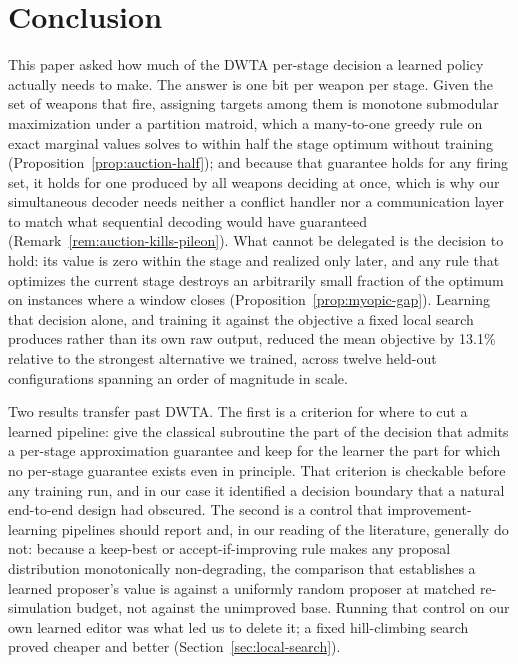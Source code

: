 \section{Conclusion}
\label{sec:conclusion}

This paper asked how much of the DWTA per-stage decision a learned policy
actually needs to make. The answer is one bit per weapon per stage. Given the
set of weapons that fire, assigning targets among them is monotone submodular
maximization under a partition matroid, which a many-to-one greedy rule on
exact marginal values solves to within half the stage optimum without
training (Proposition~\ref{prop:auction-half}); and because that guarantee
holds for any firing set, it holds for one produced by all weapons deciding
at once, which is why our simultaneous decoder needs neither a conflict
handler nor a communication layer to match what sequential decoding would
have guaranteed (Remark~\ref{rem:auction-kills-pileon}). What cannot be
delegated is the decision to hold: its value is zero within the stage and
realized only later, and any rule that optimizes the current stage destroys
an arbitrarily small fraction of the optimum on instances where a window
closes (Proposition~\ref{prop:myopic-gap}). Learning that decision alone, and
training it against the objective a fixed local search produces rather than
its own raw output, reduced the mean objective by 13.1\% relative to the
strongest alternative we trained, across twelve held-out configurations
spanning an order of magnitude in scale.

Two results transfer past DWTA. The first is a criterion for where to cut a
learned pipeline: give the classical subroutine the part of the decision that
admits a per-stage approximation guarantee and keep for the learner the part
for which no per-stage guarantee exists even in principle. That criterion is
checkable before any training run, and in our case it identified a decision
boundary that a natural end-to-end design had obscured. The second is a
control that improvement-learning pipelines should report and, in our reading
of the literature, generally do not: because a keep-best or
accept-if-improving rule makes any proposal distribution monotonically
non-degrading, the comparison that establishes a learned proposer's value is
against a uniformly random proposer at matched re-simulation budget, not
against the unimproved base. Running that control on our own learned editor
was what led us to delete it; a fixed hill-climbing search proved cheaper
and better (Section~\ref{sec:local-search}).

